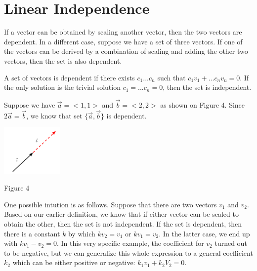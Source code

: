 \documentclass{article}
\begin{document}
\section{Linear Independence}
\par\noindent If a vector can be obtained by scaling another vector, then the two vectors are dependent. In a different case, suppose we have a set of three vectors. If one of the vectors can be derived by a combination of scaling and adding the other two vectors, then the set is also dependent. 
\newline
\par \noindent A set of vectors is dependent if there exists \( c_1 ... c_n\) such that \(c_1v_1 + ... c_nv_n = 0\). If the only solution is the trivial solution \(c_1 = ... c_n = 0\), then the set is independent. 
\newline
\begin{minipage}[c]{.5\linewidth}
	\par \noindent Suppose we have \( \vec a = <1,1>\) and \( \vec b = <2,2>\) as shown on Figure 4. Since \( 2\vec a = \vec b\), we know that set \( \{ \vec a, \vec b\}\) is dependent.
\end{minipage}%
\begin{minipage}[c]{.5\linewidth}
	\begin{center}
		\includegraphics[width=3cm]{linear-combo.png}
	\end{center}
	\begin{center}
		Figure 4
	\end{center}
\end{minipage}
\newline
\par\noindent One possible intution is as follows. Suppose that there are two vectors \(v_1\) and \(v_2\). Based on our earlier definition, we know that if either vector can be scaled to obtain the other, then the set is not independent. If the set is dependent, then there is a constant \(k\) by which \(kv_2 = v_1\) or \(kv_1 = v_2\). In the latter case, we end up with \(kv_1 - v_2 = 0\). In this very specific example, the coefficient for \(v_2\) turned out to be negative, but we can generalize this whole expression to a general coefficient \(k_2\) which can be either positive or negative: \(k_1v_1 + k_2V_2 = 0\).
\end{document}

